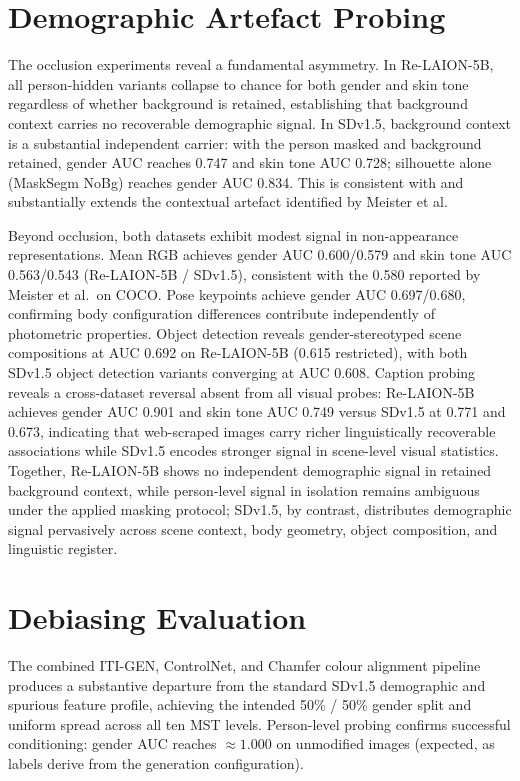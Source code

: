 \section{Demographic Artefact Probing}

The occlusion experiments reveal a fundamental asymmetry. In Re-LAION-5B, all
person-hidden variants collapse to chance for both gender and skin tone regardless of
whether background is retained, establishing that background context carries no
recoverable demographic signal. In SDv1.5, background context is a substantial
independent carrier: with the person masked and background retained, gender AUC reaches
0.747 and skin tone AUC 0.728; silhouette alone (MaskSegm NoBg) reaches gender AUC
0.834. This is consistent with and substantially extends the contextual artefact
identified by Meister et al.

Beyond occlusion, both datasets exhibit modest signal in non-appearance representations.
Mean RGB achieves gender AUC 0.600/0.579 and skin tone AUC 0.563/0.543 (Re-LAION-5B /
SDv1.5), consistent with the 0.580 reported by Meister et al.\ on COCO. Pose keypoints
achieve gender AUC 0.697/0.680, confirming body configuration differences contribute
independently of photometric properties. Object detection reveals gender-stereotyped scene
compositions at AUC 0.692 on Re-LAION-5B (0.615 restricted), with both SDv1.5
object detection variants converging at AUC 0.608. Caption probing reveals a cross-dataset reversal
absent from all visual probes: Re-LAION-5B achieves gender AUC 0.901 and skin tone AUC
0.749 versus SDv1.5 at 0.771 and 0.673, indicating that web-scraped images carry richer
linguistically recoverable associations while SDv1.5 encodes stronger signal in
scene-level visual statistics. Together, Re-LAION-5B shows no independent demographic signal in retained background context,
while person-level signal in isolation remains ambiguous under the applied masking protocol; SDv1.5,
by contrast, distributes demographic signal pervasively across scene context, body geometry, object composition, and linguistic register.

\section{Debiasing Evaluation}

The combined ITI-GEN, ControlNet, and Chamfer colour alignment pipeline produces a
substantive departure from the standard SDv1.5 demographic and spurious feature profile,
achieving the intended 50\% / 50\% gender split and uniform spread across all ten MST
levels. Person-level probing confirms successful conditioning: gender AUC reaches
${\approx}1.000$ on unmodified images (expected, as labels derive from the generation
configuration).

